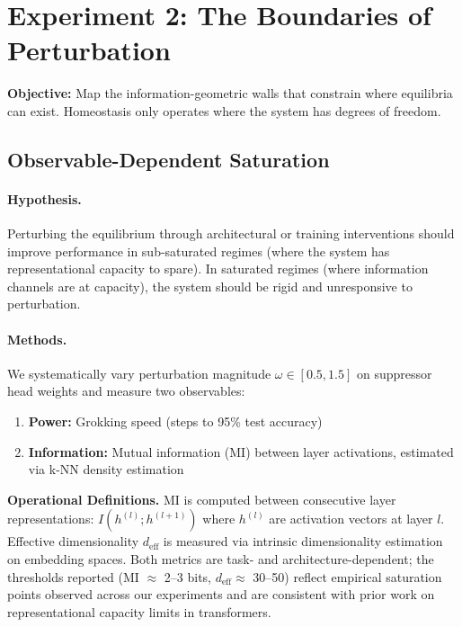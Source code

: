 \section{Experiment 2: The Boundaries of Perturbation}\label{sec:exp2}

\textbf{Objective:} Map the information-geometric walls that constrain where equilibria can exist. Homeostasis only operates where the system has degrees of freedom.

\subsection{Observable-Dependent Saturation}

\paragraph{Hypothesis.}
Perturbing the equilibrium through architectural or training interventions should improve performance in sub-saturated regimes (where the system has representational capacity to spare). In saturated regimes (where information channels are at capacity), the system should be rigid and unresponsive to perturbation.

\paragraph{Methods.}
We systematically vary perturbation magnitude $\omega \in [0.5, 1.5]$ on suppressor head weights and measure two observables:
\begin{enumerate}
\item \textbf{Power:} Grokking speed (steps to 95\% test accuracy)
\item \textbf{Information:} Mutual information (MI) between layer activations, estimated via k-NN density estimation~\cite{kraskov2004estimating}
\end{enumerate}

\textbf{Operational Definitions.} MI is computed between consecutive layer representations: $I(h^{(l)}; h^{(l+1)})$ where $h^{(l)}$ are activation vectors at layer $l$. Effective dimensionality $d_{\text{eff}}$ is measured via intrinsic dimensionality estimation on embedding spaces. Both metrics are task- and architecture-dependent; the thresholds reported (MI $\approx$ 2--3 bits, $d_{\text{eff}} \approx$ 30--50) reflect empirical saturation points observed across our experiments and are consistent with prior work on representational capacity limits in transformers.

